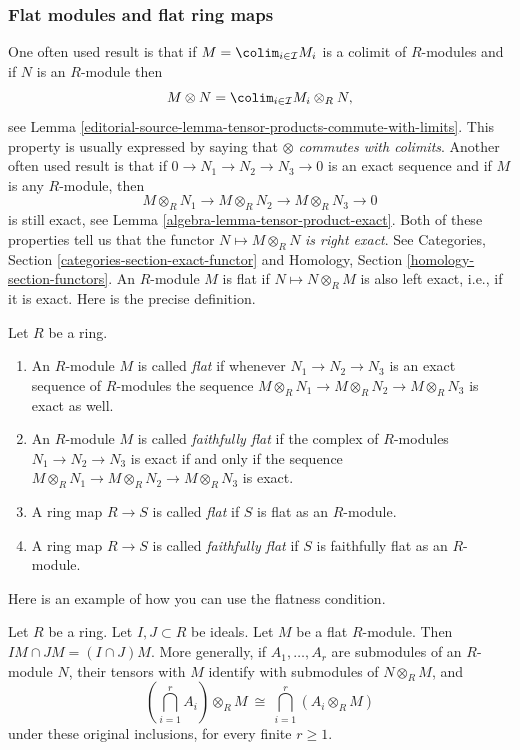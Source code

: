 \subsubsection{Flat modules and flat ring maps}
\label{editorial-source-section-flat}

\noindent
One often used result is that if $M = \colim_{i\in \mathcal{I}} M_i$
is a colimit of $R$-modules and if $N$ is an $R$-module then
$$
M \otimes N
=
\colim_{i\in \mathcal{I}} M_i \otimes_R N,
$$
see Lemma \ref{editorial-source-lemma-tensor-products-commute-with-limits}.
This property is usually expressed by saying
that {\it $\otimes$ commutes with colimits}.
Another often used result is that if $0 \to N_1 \to N_2 \to N_3 \to 0$
is an exact sequence and if $M$ is any $R$-module, then
$$
M \otimes_R N_1
\to
M \otimes_R N_2
\to
M \otimes_R N_3
\to
0
$$
is still exact, see Lemma \ref{algebra-lemma-tensor-product-exact}.
Both of these properties tell us that the functor
$N \mapsto M \otimes_R N$ {\it is right exact}.
See Categories, Section \ref{categories-section-exact-functor}
and Homology, Section \ref{homology-section-functors}.
An $R$-module $M$ is flat if $N \mapsto N \otimes_R M$ is also left exact,
i.e., if it is exact. Here is the precise definition.

\begin{definition}
\label{editorial-source-definition-flat}
Let $R$ be a ring.
\begin{enumerate}
\item An $R$-module $M$ is called {\it flat} if whenever
$N_1 \to N_2 \to N_3$ is an exact sequence of $R$-modules
the sequence $M \otimes_R N_1 \to M \otimes_R N_2 \to M \otimes_R N_3$
is exact as well.
\item An $R$-module $M$ is called {\it faithfully flat} if the
complex of $R$-modules
$N_1 \to N_2 \to N_3$ is exact if and only if
the sequence $M \otimes_R N_1 \to M \otimes_R N_2 \to M \otimes_R N_3$
is exact.
\item A ring map $R \to S$ is called {\it flat} if
$S$ is flat as an $R$-module.
\item A ring map $R \to S$ is called {\it faithfully flat} if
$S$ is faithfully flat as an $R$-module.
\end{enumerate}
\end{definition}

\noindent
Here is an example of how you can use the flatness condition.

\begin{lemma}
\label{editorial-source-lemma-flat-intersect-ideals}
Let $R$ be a ring. Let $I, J \subset R$ be ideals. Let $M$ be a flat
$R$-module. Then $IM\cap JM=(I\cap J)M$.
More generally, if $A_1,\ldots,A_r$ are submodules of an
$R$-module $N$, their tensors with $M$ identify with
submodules of $N\otimes_R M$, and
$$
\left(\bigcap_{i=1}^r A_i\right)\otimes_R M
\ \cong\ \bigcap_{i=1}^r(A_i\otimes_R M)
$$
under these original inclusions, for every finite $r\geq1$.
\end{lemma}

